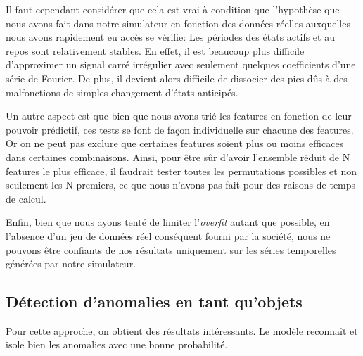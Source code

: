 \documentclass[french]{article}
\theoremstyle{mytheoremstyle}
\theoremstyle{mytheoremstyle}
\theoremstyle{myproblemstyle}
\begin{document}
        Il faut cependant considérer que cela est vrai à condition que l'hypothèse que nous avons fait dans notre simulateur en fonction des données réelles auxquelles nous avons rapidement eu accès se vérifie: Les périodes des états actifs et au repos sont relativement stables. En effet, il est beaucoup plus difficile d'approximer un signal carré irrégulier avec seulement quelques coefficients d'une série de Fourier. De plus, il devient alors difficile de dissocier des pics dûs à des malfonctions de simples changement d'états anticipés.
        
    Un autre aspect est que bien que nous avons trié les features en fonction de leur pouvoir prédictif, ces tests se font de façon individuelle sur chacune des features. Or on ne peut pas exclure que certaines features soient plus ou moins efficaces dans certaines combinaisons. Ainsi, pour être sûr d'avoir l'ensemble réduit de N features le plus efficace, il faudrait tester toutes les permutations possibles et non seulement les N premiers, ce que nous n'avons pas fait pour des raisons de temps de calcul.
    
    Enfin, bien que nous ayons tenté de limiter l'\emph{overfit} autant que possible, en l'absence d'un jeu de données réel conséquent fourni par la société, nous ne pouvons être confiants de nos résultats uniquement sur les séries temporelles générées par notre simulateur.
        
        
    \subsection{Détection d'anomalies en tant qu'objets}
    Pour cette approche, on obtient des résultats intéressants. Le modèle reconnaît et isole bien les anomalies avec une bonne probabilité.
    
\end{document}
